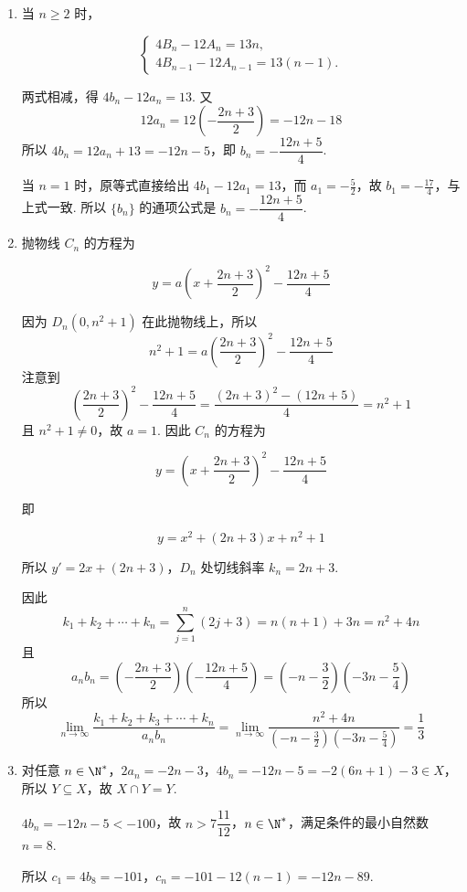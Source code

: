 \begin{solution}
\begin{enumerate}
\item 当 \(n\geqslant2\) 时，

\[
\begin{cases}
4B_n-12A_n=13n,\\
4B_{n-1}-12A_{n-1}=13(n-1).
\end{cases}
\]

两式相减，得 \(4b_n-12a_n=13\). 又
\[
12a_n=12\left(-\frac{2n+3}{2}\right)=-12n-18
\]
所以 \(4b_n=12a_n+13=-12n-5\)，即 \(b_n=-\dfrac{12n+5}{4}\).

当 \(n=1\) 时，原等式直接给出 \(4b_1-12a_1=13\)，而 \(a_1=-\frac52\)，故 \(b_1=-\frac{17}{4}\)，与上式一致. 所以 \(\{b_n\}\) 的通项公式是 \(b_n=-\dfrac{12n+5}{4}\).

\item 抛物线 \(C_n\) 的方程为

\[
y=a\left(x+\frac{2n+3}{2}\right)^2-\frac{12n+5}{4}
\]

因为 \(D_n(0,n^2+1)\) 在此抛物线上，所以
\[
n^2+1=a\left(\frac{2n+3}{2}\right)^2-\frac{12n+5}{4}
\]
注意到
\[
\left(\frac{2n+3}{2}\right)^2-\frac{12n+5}{4}=\frac{(2n+3)^2-(12n+5)}4=n^2+1
\]
且 \(n^2+1\ne0\)，故 \(a=1\). 因此 \(C_n\) 的方程为

\[
y=\left(x+\frac{2n+3}{2}\right)^2-\frac{12n+5}{4}
\]

即

\[
y=x^2+(2n+3)x+n^2+1
\]

所以 \(y'=2x+(2n+3)\)，\(D_n\) 处切线斜率 \(k_n=2n+3\).

因此
\[
k_1+k_2+\cdots+k_n=\sum_{j=1}^{n}(2j+3)=n(n+1)+3n=n^2+4n
\]
且
\[
a_nb_n=\left(-\frac{2n+3}{2}\right)\left(-\frac{12n+5}{4}\right)=\left(-n-\frac32\right)\left(-3n-\frac54\right)
\]
所以
\[
\lim_{n\to\infty}\frac{k_1+k_2+k_3+\cdots+k_n}{a_nb_n}=\lim_{n\to\infty}\frac{n^2+4n}{\left(-n-\frac{3}{2}\right)\left(-3n-\frac{5}{4}\right)}=\frac{1}{3}
\]

\item 对任意 \(n\in\N^{*}\)，\(2a_n=-2n-3\)，\(4b_n=-12n-5=-2(6n+1)-3\in X\)，所以 \(Y\subseteq X\)，故 \(X\cap Y=Y\).

\(4b_n=-12n-5<-100\)，故 \(n>7\dfrac{11}{12}\)，\(n\in\N^{*}\)，满足条件的最小自然数 \(n=8\).

所以 \(c_1=4b_8=-101\)，\(c_n=-101-12(n-1)=-12n-89\).
\end{enumerate}
\end{solution}
